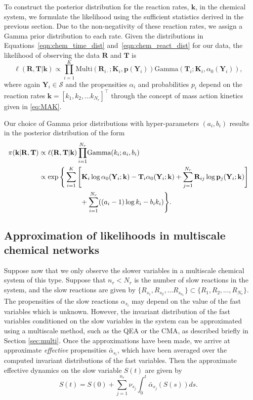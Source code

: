 \documentclass[final]{siamltex}
\begin{document}
To construct the posterior distribution for the reaction rates, $\mathbf{k}$, in the chemical system, we formulate the likelihood using the sufficient statistics derived in the previous section. Due to the non-negativity of these reaction rates, we assign a Gamma prior distribution to each rate. Given the distributions in Equations~\eqref{eqn:chem_time_dist} and~\eqref{eqn:chem_react_dist} for our data, the likelihood of observing the data $\mathbf{R}$ and $\mathbf{T}$ is
\[
	\ell(\mathbf{R}, \mathbf{T}|\mathbf{k}) \propto \prod\limits_{i=1}^K \text{Multi}(\mathbf{R}_{i\cdot}; \mathbf{K}_i, \mathbf{p}(\mathbf{Y}_i))\text{Gamma}(\mathbf{T}_i; \mathbf{K}_i, \alpha_0(\mathbf{Y}_i)),
\]
where again $\mathbf{Y}_i \in \mathcal{S}$ and the propensities
$\alpha_i$ and probabilities $p_i$ depend on the reaction rates
$\mathbf{k} = [k_1, k_2, \ldots k_{N_r}]^\top$ through the concept of
mass action kinetics given in \eqref{eq:MAK}.

Our choice of Gamma prior distributions with hyper-parameters $(a_i, b_i)$ results in the posterior distribution of the form
\begin{align}
	\pi(\mathbf{k}|\mathbf{R}, \mathbf{T}) &\propto \ell(\mathbf{R}, \mathbf{T}|\mathbf{k})
	\prod_{i=1}^{N_r} \! \text{Gamma}(k_i; a_i, b_i) \notag \\
		&\propto \exp\Bigg\{\sum\limits_{i=1}^K \Bigg[
				\mathbf{K}_i\log \alpha_0(\mathbf{Y}_i; \mathbf{k}) - \mathbf{T}_i\alpha_0(\mathbf{Y}_i; \mathbf{k}) %
				+\sum_{j=1}^{N_r} \mathbf{R}_{ij}\log\mathbf{p}_j(\mathbf{Y}_i; \mathbf{k})
			\Bigg]  \notag\\
		&	\qquad\qquad\qquad{} + \sum_{i=1}^{N_r} ((a_i-1)\log k_i - b_ik_i)\Bigg\}. \label{eqn:chem_posterior}
\end{align}

\subsection{Approximation of likelihoods in multiscale chemical
  networks}
Suppose now that we only observe the slower variables in a
multiscale chemical system of this type. Suppose that $n_r < N_r$ is the number of slow
reactions in the system, and the slow reactions are given by $\{R_{s_1},
R_{s_2}, \ldots R_{s_{n_r}} \} \subset \{R_1, R_2, \ldots , R_{N_r}
\}$. The propensities of the slow
reactions $\alpha_{s_i}$ may depend on the value of the fast variables which is
unknown. However, the invariant distribution of the fast variables
conditioned on the slow variables in the system can be approximated
using a multiscale method, such as the QEA or the CMA, as described
briefly in Section \ref{sec:multi}. Once the approximations have been
made, we arrive at approximate \emph{effective} propensities $\bar{\alpha}_{s_i}$, which
have been averaged over the computed invariant distributions of the
fast variables. Then the approximate effective dynamics on the slow variable $S(t)$ are given by 
\begin{equation}\label{eq:RTCS}
S(t) = S(0) + \sum_{j=1}^{n_r} \nu_{s_j} \int_0^t \bar{\alpha}_{s_j}(S(s)) ds.
\end{equation}
\end{document}
